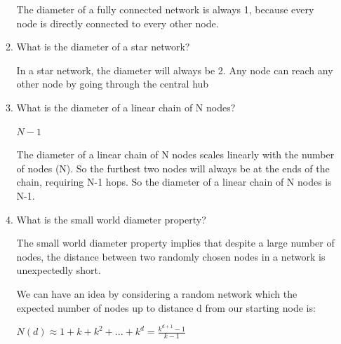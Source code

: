 \documentclass{amsart}
\theoremstyle{definition}
\theoremstyle{remark}
\numberwithin{equation}{section}
\begin{document}
\begin{enumerate}
\begin{enumerate}
The diameter of a fully connected network is always 1, because every node is directly connected to every other node.

\vspace{0.2cm}

\item What is the diameter of a star network? \vspace{0.2cm}

In a star network, the diameter will always be 2. Any node can reach any other node by going through the central hub


\vspace{0.2cm}

\item What is the diameter of a linear chain of N nodes? \vspace{0.5cm}

$N-1$

\vspace{0.2cm}

The diameter of a linear chain of N nodes scales linearly with the number of nodes (N). So the furthest two nodes will always be at the ends of the chain, requiring N-1 hops. So the diameter of a linear chain of N nodes is N-1.

\vspace{0.2cm}

\item What is the small world diameter property? \vspace{0.5cm}

The small world diameter property implies that despite a large number of nodes, the distance between two randomly chosen nodes in a network is unexpectedly short.

\vspace{0.5cm}

We can have an idea by considering a random network which the expected number of nodes up to distance d from our starting node is:

\vspace{0.2cm}

$
N\left(d\right) \approx 1 + k + k^{2} + ... + k^{d} = \frac{k^{d+1} -1}{k -1}
$

\vspace{0.2cm}


\end{enumerate}
\end{enumerate}
\end{document}

